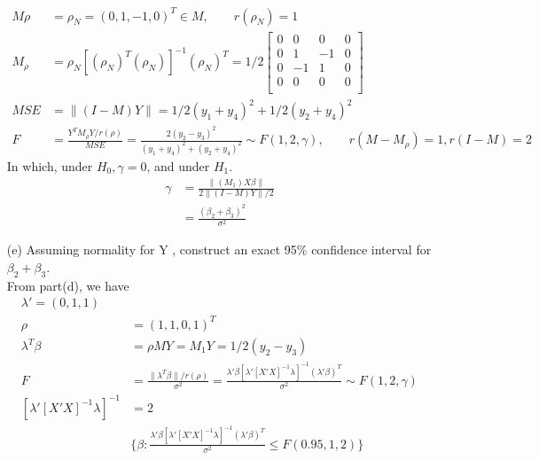 \begin{itemize}
\begin{align*}
    M\rho &=  \rho_N= (0, 1, -1, 0)^T \in M, \qquad r(\rho_N) = 1\\
    M_{\rho} &= \rho_N [(\rho_N)^T (\rho_N)]^{-1} (\rho_N)^T=1/2 \begin{bmatrix}
           0  & 0 & 0 & 0  \\
           0 &  1 & -1 & 0\\
           0  & -1 & 1 & 0 \\
           0 & 0 & 0 & 0\\
         \end{bmatrix}\\
    MSE &= \lVert (I-M)Y \rVert = 1/2 (y_1+y_4)^2 + 1/2 (y_2 + y_4)^2 \\
    F &= \frac{Y^T M_{\rho} Y/r(\rho)}{MSE} = \frac{2(y_2 - y_3)^2}{(y_1+y_4)^2 + (y_2 + y_4)^2} \sim F(1,2, \gamma), \qquad r(M-M_{\rho}) = 1, r(I-M) = 2
\end{align*} 
In which, under $H_0, \gamma = 0$, and under $H_1$.
\begin{align*}
    \gamma &= \frac{\lVert (M_1) X\beta \rVert}{2 \lVert (I-M)Y \rVert/2}\\
    &= \frac{(\beta_2 + \beta_3)^2}{\sigma^2}
\end{align*} 
\item[(e)] Assuming normality for Y , construct an exact 95$\%$ confidence interval for $\beta_2 + \beta_3$.\\
From part(d), we have
\begin{align*}
 \lambda' = (0, 1, 1)\\
 \rho &= (1, 1, 0, 1)^T\\
 \lambda^T \beta &=  \rho M Y = M_1 Y= 1/2 (y_2 - y_3)\\
  F &= \frac{\lVert \lambda^T \beta \rVert/r(\rho)}{\sigma^2} = \frac{\lambda'\beta [\lambda'[X'X]^{-1} \lambda]^{-1} (\lambda'\beta)^T }{\sigma^2} \sim F(1,2, \gamma)\\
  [\lambda'[X'X]^{-1} \lambda]^{-1} & = 2\\
 &\{\beta: \frac{\lambda'\beta [\lambda'[X'X]^{-1} \lambda]^{-1} (\lambda'\beta)^T }{\sigma^2} \leq F(0.95, 1,2) \} 
\end{align*} 

\end{itemize}

